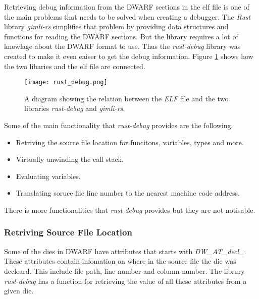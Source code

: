
Retrieving debug information from the \gls{DWARF} sections in the \gls{elf} file is one of the main problems that needs to be solved when creating a debugger.
The \emph{Rust} library \emph{gimli-rs} simplifies that problem by providing data structures and functions for reading the \gls{DWARF} sections.
But the library requires a lot of knowlage about the \gls{DWARF} format to use.
Thus the \emph{rust-debug} library was created to make it even eaiser to get the debug information.
Figure \ref{fig:rustdebug} shows how the two libaries and the \gls{elf} file are connected.


\begin{figure}[h]
	\centering
	\texttt{[image: rust\_debug.png]}
	\caption{A diagram showing the relation between the \emph{ELF} file and the two libraries \emph{rust-debug} and \emph{gimli-rs}.}
	\label{fig:rustdebug}
\end{figure}


Some of the main functionality that \emph{rust-debug} provides are the following:

\begin{itemize}
  \item Retriving the source file location for funcitons, variables, types and more.
  \item Virtually unwinding the call stack.
  \item Evaluating variables.
  \item Translating soruce file line number to the nearest machine code address.
\end{itemize}

There is more functionalities that \emph{rust-debug} provides but they are not notisable.



\subsubsection{Retriving Source File Location}
Some of the \glspl{die} in \gls{DWARF} have attributes that starts with \emph{DW\_AT\_decl\_}.
These attributes contain infomation on where in the source file the \gls{die} was decleard.
This include file path, line number and column number.
The library \emph{rust-debug} has a function for retrieving the value of all these attributes from a given \gls{die}.



